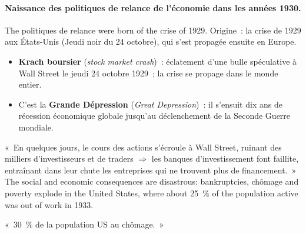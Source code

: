 \paragraph{Naissance des politiques de relance de l'économie dans les années
1930.} The politiques de relance were born of the crise of 1929.
Origine~: la crise de 1929 aux États-Unis (Jeudi noir du 24 octobre), qui s'est
propagée ensuite en Europe.
\begin{itemize}
  \item \textbf{Krach boursier} (\textit{stock market crash})~: éclatement d'une
    bulle spéculative à Wall Street le jeudi 24 octobre 1929~; la crise se
    propage dans le monde entier.
  \item C'est la \textbf{Grande Dépression} (\textit{Great Depression})~: il
    s'ensuit dix ans de récession économique globale jusqu'au déclenchement de la
    Seconde Guerre mondiale.
\end{itemize}
«~En quelques jours, le cours des actions s'écroule à Wall Street, ruinant des
milliers d'investisseurs et de traders $\Rightarrow$ les banques d'investissement
font faillite, entraînant dans leur chute les entreprises qui ne trouvent plus de
financement.~» The social and economic consequences are disastrous: bankruptcies,
chômage and poverty explode in the United States, where about 25~\% of the
population active was out of work in 1933.

\begin{remark}
  «~30~\% de la population US au chômage.~»
\end{remark}

